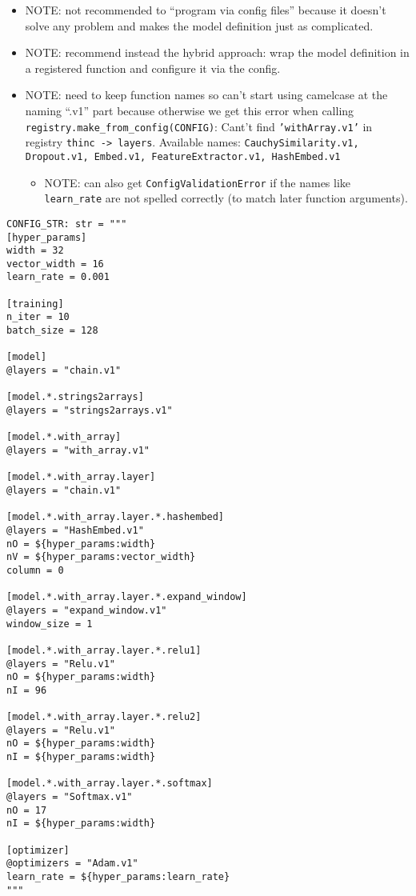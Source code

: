 \documentclass[
]{article}
\providecommand{\tightlist}{%
  \setlength{\itemsep}{0pt}\setlength{\parskip}{0pt}}
\begin{document}
\begin{itemize}
\tightlist
\item
  NOTE: not recommended to ``program via config files'' because it
  doesn't solve any problem and makes the model definition just as
  complicated.
\item
  NOTE: recommend instead the hybrid approach: wrap the model definition
  in a registered function and configure it via the config.
\item
  NOTE: need to keep function names so can't start using camelcase at
  the naming ``.v1'' part because otherwise we get this error when
  calling \texttt{registry.make_from_config(CONFIG)}:
  Cant't find \texttt{'withArray.v1'} in registry
  \texttt{thinc -> layers}. Available names:
  \texttt{CauchySimilarity.v1, Dropout.v1, Embed.v1, FeatureExtractor.v1, HashEmbed.v1}

  \begin{itemize}
  \tightlist
  \item
    NOTE: can also get \texttt{ConfigValidationError} if
    the names like \texttt{learn_rate} are not spelled
    correctly (to match later function arguments).
  \end{itemize}
\end{itemize}

\begin{verbatim}
CONFIG_STR: str = """
[hyper_params]
width = 32
vector_width = 16
learn_rate = 0.001

[training]
n_iter = 10
batch_size = 128

[model]
@layers = "chain.v1"

[model.*.strings2arrays]
@layers = "strings2arrays.v1"

[model.*.with_array]
@layers = "with_array.v1"

[model.*.with_array.layer]
@layers = "chain.v1"

[model.*.with_array.layer.*.hashembed]
@layers = "HashEmbed.v1"
nO = ${hyper_params:width}
nV = ${hyper_params:vector_width}
column = 0

[model.*.with_array.layer.*.expand_window]
@layers = "expand_window.v1"
window_size = 1

[model.*.with_array.layer.*.relu1]
@layers = "Relu.v1"
nO = ${hyper_params:width}
nI = 96

[model.*.with_array.layer.*.relu2]
@layers = "Relu.v1"
nO = ${hyper_params:width}
nI = ${hyper_params:width}

[model.*.with_array.layer.*.softmax]
@layers = "Softmax.v1"
nO = 17
nI = ${hyper_params:width}

[optimizer]
@optimizers = "Adam.v1"
learn_rate = ${hyper_params:learn_rate}
"""
\end{verbatim}
\end{document}
